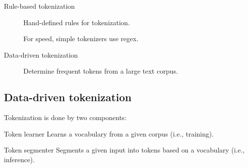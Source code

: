 \begin{description}
    \item[Rule-based tokenization]  
        Hand-defined rules for tokenization.
        \begin{remark}
            For speed, simple tokenizers use regex.
        \end{remark}

    \item[Data-driven tokenization] 
        Determine frequent tokens from a large text corpus.
\end{description}


\subsection{Data-driven tokenization}

Tokenization is done by two components:
\begin{descriptionlist}
    \item[Token learner] 
        Learns a vocabulary from a given corpus (i.e., training).

    \item[Token segmenter] 
        Segments a given input into tokens based on a vocabulary (i.e., inference).
\end{descriptionlist}


